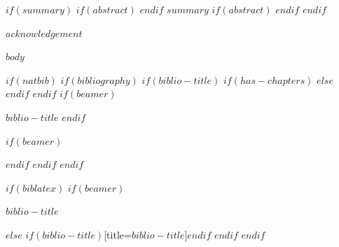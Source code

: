 \documentclass[11pt,a4paper,oneside,openright,titlepage,
  headinclude,footinclude,BCOR=5mm,
  numbers=noenddot,cleardoublepage=empty,
  tablecaptionabove, dottedtoc,
  bibliography=totoc]{scrreprt}
\begin{document}
$if(summary)$
$if(abstract)$
\clearpage
$endif$
$summary$
$if(abstract)$
\endgroup
$endif$
\vfill
$endif$


\begingroup
\let\clearpage\relax
\let\cleardoublepage\relax
\let\cleardoublepage\relax


$acknowledgement$

\endgroup

\clearpage
{}
{}
\setcounter{tocdepth}{2}
\begingroup 
  \let\clearpage\relax
  \let\cleardoublepage\relax
  \tableofcontents
\endgroup
\markboth{\spacedlowsmallcaps{\contentsname}}
{\spacedlowsmallcaps{\contentsname}} 

\begingroup 
  \let\clearpage\relax
  \let\cleardoublepage\relax
\endgroup

\cleardoublepage


$body$

$if(natbib)$
$if(bibliography)$
$if(biblio-title)$
$if(has-chapters)$
\renewcommand\bibname{$biblio-title$}
$else$
\renewcommand\refname{$biblio-title$}
$endif$ %
$endif$ %
$if(beamer)$
\begin{frame}[allowframebreaks]{$biblio-title$}
  \bibliographytrue
$endif$ %
  
$if(beamer)$
\end{frame}
$endif$ %
$endif$ %
$endif$ %


$if(biblatex)$
$if(beamer)$
\begin{frame}[allowframebreaks]{$biblio-title$}
  \bibliographytrue
  \printbibliography[heading=none]
\end{frame}
$else$
\printbibliography$if(biblio-title)$[title=$biblio-title$]$endif$
$endif$ %
$endif$ %
\end{document}
